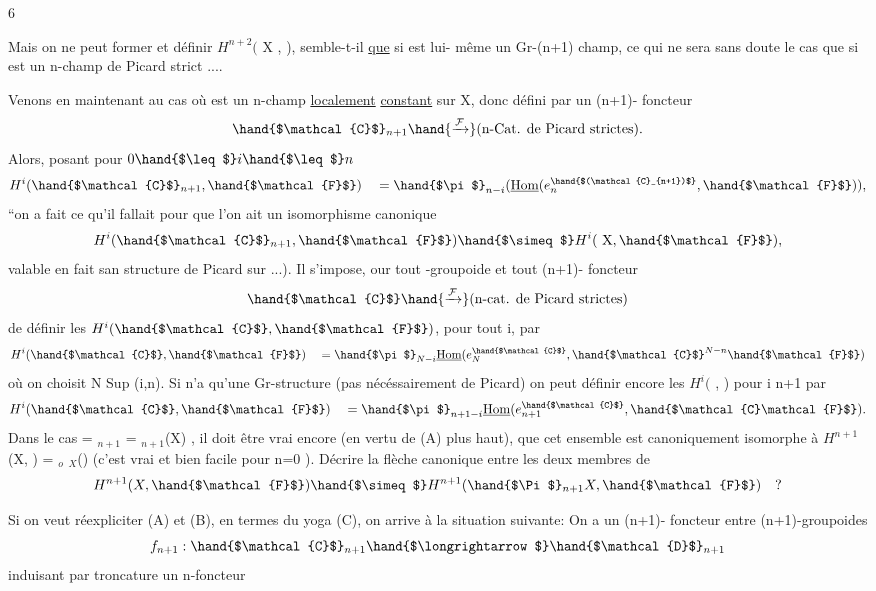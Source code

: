  \hfill 6

Mais on ne peut former  et définir $H^{n+2}($ X ,  ), semble-t-il
\uline{que} si  est lui- même un Gr-(n+1) champ, ce qui ne sera sans
doute le cas que si  est un n-champ de Picard strict ....

Venons en maintenant au cas où  est un n-champ \uline{localement}
\uline{constant} sur X, donc défini par un (n+1)- foncteur
\[ \hand{$\mathcal{C}$}_{n+1} \hand{\xrightarrow{\mathcal{F}}} \text{(n-Cat. de Picard strictes).} \]
Alors, posant pour $0 \hand{$\leq$} i \hand{$\leq$} n$
\[ H^i(\hand{$\mathcal{C}$}_{n+1}, \hand{$\mathcal{F}$}) \quad = \hand{$\pi$}_{n-i} (\underline{\text{Hom}} (e_n^{\hand{$(\mathcal{C}_{n+1})$}}, \hand{$\mathcal{F}$})), \]
``on a fait ce qu'il fallait pour que l'on ait un isomorphisme canonique
\[ H^i(\hand{$\mathcal{C}$}_{n+1}, \hand{$\mathcal{F}$}) \hand{$\simeq$} H^i(\text{ X}, \hand{$\mathcal{F}$} ), \]
\hand{(}valable en fait san structure de Picard sur  ...). Il s'impose, our
tout \hand{$\infty$} -groupoide  et tout (n+1)- foncteur
\[ \hand{$\mathcal{C}$} \hand{\xrightarrow{\mathcal{F}}} \text{(n-cat. de Picard strictes)} \]
de définir les $H^i(\hand{$\mathcal{C}$}, \hand{$\mathcal{F}$})$, pour tout i, par
\[ H^i(\hand{$\mathcal{C}$},\hand{$\mathcal{F}$}) \quad = \hand{$\pi$}_{N-i} \underline{\text{Hom}} (e_N^{\hand{$\mathcal{C}$}} ,\hand{$\mathcal{C}$}^{N-n} \hand{$\mathcal{F}$}) \]
où on choisit N \hand{$\geq$}Sup (i,n). Si  n'a qu'une Gr-structure (pas
nécéssairement de Picard) on peut définir encore les $H^i($ ,  ) pour
i \hand{$\leq$} n+1 par
\[ H^i(\hand{$\mathcal{C}$}, \hand{$\mathcal{F}$} ) \quad = \hand{$\pi$}_{n+1-i} \underline{\text{Hom}} ( e_{n+1}^{\hand{$\mathcal{C}$}} , \hand{$\mathcal{C}\mathcal{F}$}). \]
Dans le cas  = $_{n+1}$ = \hand{$\Pi$}$_{n+1}$(X) , il doit être vrai encore
(en vertu de (A) plus haut), que cet ensemble est canoniquement isomorphe
à $H^{n+1}$(X, ) = \hand{$\pi$}$_o$ \hand{$\Gamma$}$_X$() (c'est vrai et bien facile pour n=0 ).
Décrire la flèche canonique entre les deux membres de
\[ H^{n+1}(X , \hand{$\mathcal{F}$}) \hand{$\simeq$} H^{n+1}(\hand{$\Pi$}_{n+1}X, \hand{$\mathcal{F}$}) \quad ? \]

Si on veut réexpliciter (A) et (B), en termes du yoga (C), on arrive
à la situation suivante:
On a un (n+1)- foncteur entre (n+1)-groupoides
\[ f_{n+1} : \hand{$\mathcal{C}$}_{n+1} \hand{$\longrightarrow$} \hand{$\mathcal{D}$}_{n+1} \]
induisant par troncature un n-foncteur

